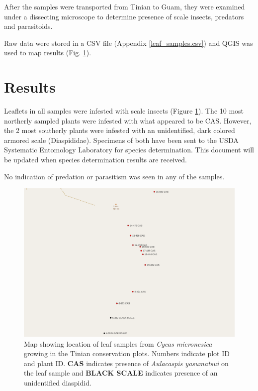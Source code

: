 \documentclass[12pt,letterpaper,english,bibliography=totocnumbered, abstract=on]{scrartcl}
\begin{document}
After the samples were transported from Tinian to Guam, they were examined under a dissecting microscope to determine presence of scale insects, predators and parasitoids.  

Raw data were stored in a CSV file (Appendix \ref{leaf_samples.csv}) and QGIS was used to map results (Fig. \ref{fig:map-image}). 

\section{Results}

Leaflets in all samples were infested with scale insects (Figure \ref{fig:map-image}). The 10 most northerly sampled plants were infested with what appeared to be CAS. However, the 2 most southerly plants were infested with an unidentified, dark colored armored scale (Diaspididae). Specimens of both have been sent to the USDA Systematic Entomology Laboratory for species determination. This document will be updated when species determination results are received.

No indication of predation or parasitism was seen in any of the samples. 


%	

\begin{figure}[h!]
	\centering
	\includegraphics[width=\linewidth]{../leaf_samples/map-image}
	\caption{Map showing location of leaf samples from \textit{Cycas micronesica} growing in the Tinian conservation plots. Numbers indicate plot ID and plant ID. \textbf{CAS} indicates presence of \textit{Aulacaspis yasumatsui} on the leaf sample and \textbf{BLACK SCALE} indicates presence of an unidentified diaspidid.}
	\label{fig:map-image}
\end{figure}
\end{document}
